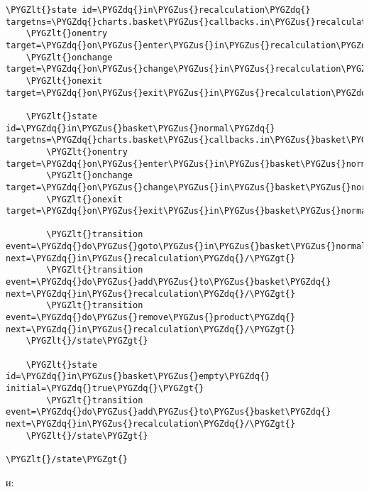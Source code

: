\documentclass[letterpaper,10pt,english]{sphinxmanual}
\def\PYGZus{\char`\_}
\def\PYGZlt{\char`\<}
\def\PYGZgt{\char`\>}
\def\PYGZdq{\char`\"}
\begin{document}
\begin{Verbatim}[commandchars=\\\{\}]
\PYGZlt{}state id=\PYGZdq{}in\PYGZus{}recalculation\PYGZdq{} targetns=\PYGZdq{}charts.basket\PYGZus{}callbacks.in\PYGZus{}recalculation\PYGZdq{}\PYGZgt{}
    \PYGZlt{}onentry target=\PYGZdq{}on\PYGZus{}enter\PYGZus{}in\PYGZus{}recalculation\PYGZdq{}/\PYGZgt{}
    \PYGZlt{}onchange target=\PYGZdq{}on\PYGZus{}change\PYGZus{}in\PYGZus{}recalculation\PYGZdq{}/\PYGZgt{}
    \PYGZlt{}onexit target=\PYGZdq{}on\PYGZus{}exit\PYGZus{}in\PYGZus{}recalculation\PYGZdq{}/\PYGZgt{}

    \PYGZlt{}state id=\PYGZdq{}in\PYGZus{}basket\PYGZus{}normal\PYGZdq{} targetns=\PYGZdq{}charts.basket\PYGZus{}callbacks.in\PYGZus{}basket\PYGZus{}normal\PYGZdq{}\PYGZgt{}
        \PYGZlt{}onentry target=\PYGZdq{}on\PYGZus{}enter\PYGZus{}in\PYGZus{}basket\PYGZus{}normal\PYGZdq{}/\PYGZgt{}
        \PYGZlt{}onchange target=\PYGZdq{}on\PYGZus{}change\PYGZus{}in\PYGZus{}basket\PYGZus{}normal\PYGZdq{}/\PYGZgt{}
        \PYGZlt{}onexit target=\PYGZdq{}on\PYGZus{}exit\PYGZus{}in\PYGZus{}basket\PYGZus{}normal\PYGZdq{}/\PYGZgt{}

        \PYGZlt{}transition event=\PYGZdq{}do\PYGZus{}goto\PYGZus{}in\PYGZus{}basket\PYGZus{}normal\PYGZdq{} next=\PYGZdq{}in\PYGZus{}recalculation\PYGZdq{}/\PYGZgt{}
        \PYGZlt{}transition event=\PYGZdq{}do\PYGZus{}add\PYGZus{}to\PYGZus{}basket\PYGZdq{} next=\PYGZdq{}in\PYGZus{}recalculation\PYGZdq{}/\PYGZgt{}
        \PYGZlt{}transition event=\PYGZdq{}do\PYGZus{}remove\PYGZus{}product\PYGZdq{} next=\PYGZdq{}in\PYGZus{}recalculation\PYGZdq{}/\PYGZgt{}
    \PYGZlt{}/state\PYGZgt{}

    \PYGZlt{}state id=\PYGZdq{}in\PYGZus{}basket\PYGZus{}empty\PYGZdq{} initial=\PYGZdq{}true\PYGZdq{}\PYGZgt{}
        \PYGZlt{}transition event=\PYGZdq{}do\PYGZus{}add\PYGZus{}to\PYGZus{}basket\PYGZdq{} next=\PYGZdq{}in\PYGZus{}recalculation\PYGZdq{}/\PYGZgt{}
    \PYGZlt{}/state\PYGZgt{}

\PYGZlt{}/state\PYGZgt{}
\end{Verbatim}

и:
\end{document}
